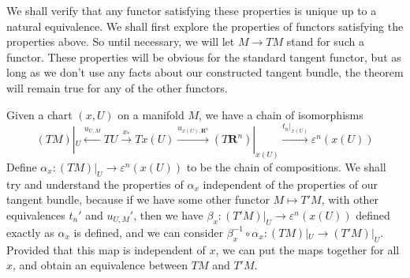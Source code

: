 We shall verify that any functor satisfying these properties is unique up to a natural equivalence. We shall first explore the properties of functors satisfying the properties above. So until necessary, we will let $M \to TM$ stand for such a functor. These properties will be obvious for the standard tangent functor, but as long as we don't use any facts about our constructed tangent bundle, the theorem will remain true for any of the other functors.

Given a chart $(x,U)$ on a manifold $M$, we have a chain of isomorphisms
%
\[ (TM)|_U \xleftarrow{u_{U,M}} TU \xrightarrow{x_*} Tx(U) \xrightarrow{u_{x(U), \mathbf{R}^n}} (T\mathbf{R}^n)|_{x(U)} \xrightarrow{t_n|_{x(U)}} \varepsilon^n(x(U)) \]
%
Define $\alpha_x: (TM)|_U \to \varepsilon^n(x(U))$ to be the chain of compositions. We shall try and understand the properties of $\alpha_x$ independent of the properties of our tangent bundle, because if we have some other functor $M \mapsto T'M$, with other equivalences $t_n'$ and $u_{U,M}'$, then we have $\beta_x: (T'M)|_U \to \varepsilon^n(x(U))$ defined exactly as $\alpha_x$ is defined, and we can consider $\beta_x^{-1} \circ \alpha_x: (TM)|_U \to (T'M)|_U$. Provided that this map is independent of $x$, we can put the maps together for all $x$, and obtain an equivalence between $TM$ and $T'M$.

